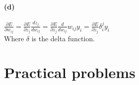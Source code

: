 \documentclass[a4paper,11pt]{article}
\begin{document}
	\paragraph{(d)}
	$\frac{\partial E}{\partial w_{ij}} = \frac{\partial E}{\partial z_j} \frac{dz_j}{dw_{ij}} = \frac{\partial E}{\partial z_j} \frac{d}{dw_{ij}} w_{ij}y_i = \frac{\partial E}{\partial z_j} \delta^j_i y_i$\\

	\noindent Where $\delta$ is the delta function.

	\section{Practical problems}
\end{document}
